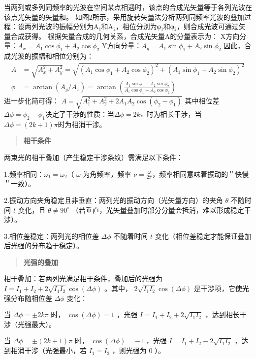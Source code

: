 \documentclass[withoutpreface,bwprint]{cumcmthesis} %
\begin{document}
\begin{appendices}
    当两列或多列同频率的光波在空间某点相遇时，该点的合成光矢量等于各列光波在该点光矢量的矢量和。
    如图2所示，采用旋转矢量法分析两列同频率光波的叠加过程：设两列光波的振幅分别为A₁和A₂，相位分别为φ₁和φ₂，则合成光波可通过矢量合成获得。
    根据矢量合成的几何关系，合成光矢量A的分量表示为：
    X方向分量：$A_x=A_1 \cos\phi_1+A_2 \cos\phi_2$
    Y方向分量：$A_y=A_1 \sin\phi_1+A_2 \sin\phi_2$
    因此，合成光波的振幅和相位分别为：
    \begin{align*}
        A    & = \sqrt{A_x^2+A_y^2} = \sqrt{(A_1 \cos\phi_1+A_2 \cos\phi_2 )^2+(A_1 \sin\phi_1+A_2 \sin\phi_2 )^2}          \\
        \phi & = \arctan(A_y/A_x) = \arctan\left(\frac{A_1 \sin\phi_1+A_2 \sin\phi_2}{A_1 \cos\phi_1+A_2 \cos\phi_2}\right)
    \end{align*}
    进一步化简可得：
    $A=\sqrt{A_1^2+A_2^2+2A_1 A_2 \cos(\phi_2-\phi_1)}$
    其中相位差$\Delta\phi=\phi_2-\phi_1$决定了干涉的性质：当$\Delta\phi=2k\pi$ 时为相长干涉，当 $\Delta\phi=(2k+1)\pi$时为相消干涉。

    \begin{quote}
        \textbf{相干条件}
    \end{quote}
    两束光的相干叠加（产生稳定干涉条纹）需满足以下条件：

    1.频率相同：\(\omega_{1} = \omega_{2}\)（ $\omega$ 为角频率，频率 $\nu= \frac{\omega}{2\pi}$，频率相同意味着振动的＂快慢＂一致）。

    2.振动方向夹角稳定且非垂直：两列光的振动方向（光矢量方向）的夹角 $\theta$ 不随时间 $t$ 变化，且 $\theta \neq 90^\circ$ （若垂直，光矢量叠加时部分分量会抵消，难以形成稳定干涉）。

    3.相位差稳定：两列光的相位差 $\Delta \phi$ 不随着时间 $t$ 变化（相位差稳定才能保证叠加后光强的分布趋于稳定）。

    \begin{quote}
        \textbf{光强的叠加}
    \end{quote}

    相干叠加：若两列光满足相干条件，叠加后的光强为 $I = I_1 + I_2 + 2 \sqrt{I_1 I_2} \cos(\Delta \phi)$ 。其中， $2 \sqrt{I_1 I_2} \cos(\Delta \phi)$ 是干涉项，它使光强分布随相位差 $\Delta \phi$ 变化：

    当 $\Delta \phi = \pm 2k\pi$ 时， $\cos(\Delta \phi) = 1$ ，光强 $I = I_1 + I_2 + 2 \sqrt{I_1 I_2}$ ，达到相长干涉（光强最大）。

    当 $\Delta \phi = \pm (2k+1)\pi$ 时， $\cos(\Delta \phi) = -1$ ，光强 $I = I_1 + I_2 - 2 \sqrt{I_1 I_2}$ ，达到相消干涉（光强最小，若 $I_1 = I_2$ ，则光强为 $0$ ）。


\end{appendices}
\end{document}
